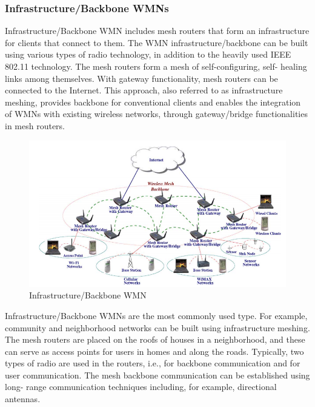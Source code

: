 \documentclass[12pt,a4paper]{report}
\begin{document}
\subsubsection{Infrastructure/Backbone WMNs}
Infrastructure/Backbone WMN includes mesh routers that form
an infrastructure for clients that connect to them. The WMN infrastructure/backbone can be built using various types of radio technology, in addition to the heavily used
IEEE 802.11 technology. The mesh routers form a mesh of self-configuring, self-
healing links among themselves. With gateway functionality, mesh routers can be
connected to the Internet. This approach, also referred to as infrastructure meshing,
provides backbone for conventional clients and enables the integration of WMNs
with existing wireless networks, through gateway/bridge functionalities in mesh
routers.
\begin{figure}[hbtp]
\centering
\includegraphics[scale=0.75]{infrastructure-mesh-clear.png}
\caption{Infrastructure/Backbone WMN}
\end{figure}

Infrastructure/Backbone WMNs are the most commonly used type. For example,
community and neighborhood networks can be built using infrastructure meshing.
The mesh routers are placed on the roofs of houses in a neighborhood, and these
can serve as access points for users in homes and along the roads. Typically, two
types of radio are used in the routers, i.e., for backbone communication and for user
communication. The mesh backbone communication can be established using long-
range communication techniques including, for example, directional antennas.
\end{document}
